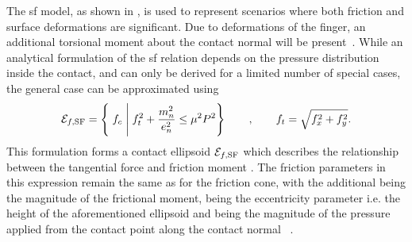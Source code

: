 The \gls{sf} model, as shown in , is used to represent scenarios where both friction and surface deformations are significant. Due to deformations of the finger, an additional torsional moment about the contact normal will be present~\cite[Chapter 38]{handbook-of-robotics}. While an analytical formulation of the \gls{sf} relation depends on the pressure distribution inside the contact, and can only be derived for a limited number of special cases, the general case can be approximated using 
%
\begin{equation} 
	\mathcal{E}_{f,\text{SF}} = \left\{ \; f_c \; \middle| \; f_t^2 + \frac{m_n^2}{e_n^2} \le \mu^2 P^2 \right\} \qquad , \qquad f_t = \sqrt{f_x^2 + f_y^2}.
	\label{eq:sf}
\end{equation}
This formulation forms a contact ellipsoid $\mathcal{E}_{f,\text{SF}}$ which describes the relationship between the tangential force  and friction moment . The friction parameters in this expression remain the same as for the friction cone, with the additional  being the magnitude of the frictional moment,  being the eccentricity parameter i.e. the height of the aforementioned ellipsoid and  being the magnitude of the pressure applied from the contact point along the contact normal ~\cite{practical-force-motion-models-for-sliding-manipulation, soft-finger-model-with-adaptive-contact-geometry-for-grasping-and-manipulation-tasks}. \medskip

